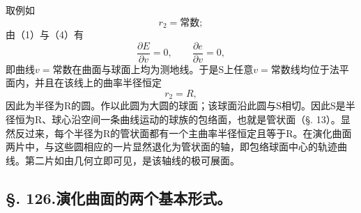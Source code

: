 取例如
\[
 r_2=\text{常数};
\]
由（1）与（4）有
\[
 \frac{\partial E}{\partial v}=0,
 \qquad
 \frac{\partial e}{\partial v}=0,
\]
即曲线\(v=\)常数在曲面与球面上均为测地线。于是S上任意\(v=\)常数线均位于法平面内，并且在该线上的曲率半径恒定
\[
 r_2=R,
\]
因此为半径为R的圆。作以此圆为大圆的球面；该球面沿此圆与S相切。因此S是半径恒为R、球心沿空间一条曲线运动的球族的包络面，也就是管状面（\S. 13）。显然反过来，每个半径为R的管状面都有一个主曲率半径恒定且等于R。在演化曲面两片中，与这些圆相应的一片显然退化为管状面的轴，即包络球面中心的轨迹曲线。第二片如由几何立即可见，是该轴线的极可展面。

\subsection*{\S. 126.\quad 演化曲面的两个基本形式。}

